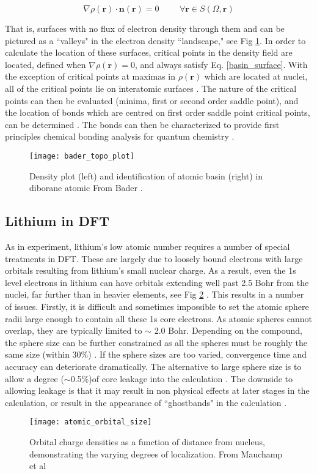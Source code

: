 \begin{equation}
\nabla \rho(\textbf{r}) \cdot \textbf{n}(\textbf{r}) = 0   \hspace{1cm} \forall\textbf{r} \in S(\Omega,\textbf{r})
\label{basin_surface}
\end{equation}

That is, surfaces with no flux of electron density through them and can be pictured as a ``valleys" in the electron density ``landscape," see Fig \ref{topo_plot}. In order to  calculate the location of these surfaces, critical points in the density field are located, defined when $\nabla \rho(\textbf{r})=0$, and always satisfy Eq. \ref{basin_surface}.  With the exception of critical points at maximas in $\rho(\textbf{r})$ which are located at nuclei, all of the critical points lie on interatomic surfaces \cite{critic2}. The nature of the critical points can then be evaluated (minima, first or second order saddle point), and the location of bonds which are centred on first order saddle point critical points, can be determined \cite{critic2}.  The bonds can then be characterized to provide first principles chemical bonding analysis for quantum chemistry \cite{fugel_variety_2018}.  

\begin{figure}
	\centering
	\texttt{[image: bader\_topo\_plot]}
	\caption{Density plot (left) and identification of atomic basin (right) in diborane atomic From Bader \cite{bader}.}
	\label{topo_plot}
\end{figure}


\subsection{Lithium in DFT}
As in experiment, lithium's low atomic number requires a number of special treatments  in DFT.  These are largely due to loosely bound electrons with large orbitals resulting from lithium's small nuclear charge.  As a result, even the 1s level electrons in lithium can have orbitals extending well past 2.5 Bohr from the nuclei, far further than in heavier elements, see Fig \ref{orbital_size} \cite{mauchamp_ab_2006}.  This results in a number of issues. Firstly, it is difficult and sometimes impossible to set the atomic sphere radii large enough to contain all these 1s core electrons.  As atomic spheres cannot overlap, they are typically limited to $\sim$ 2.0 Bohr. Depending on the compound, the sphere size can be further constrained as all the spheres must be roughly the same size (within 30\%) \cite{wien2k}.  If the sphere sizes are too varied, convergence time and accuracy can deteriorate dramatically.  The alternative to large sphere size is to allow a degree ($\sim$0.5\%)of core leakage into the calculation \cite{wien2k}.  The downside to allowing leakage is that it may result in non physical effects at later stages in the calculation, or result in the appearance of ``ghostbands" in the calculation \cite{wien2k}.

\begin{figure}
	\centering
	\texttt{[image: atomic\_orbital\_size]}
	\caption{Orbital charge densities as a function of distance from nucleus, demonstrating the varying degrees of localization.  From Mauchamp et al \cite{mauchamp_ab_2006}}
	\label{orbital_size}
\end{figure}



